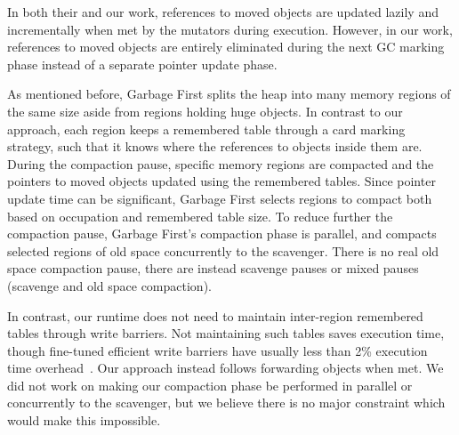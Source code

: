 \documentclass[sigplan,10pt,screen]{acmart}\settopmatter{printfolios=true,printccs=true,printacmref=true}
\newcommand{\egb}[1]{\color{blue}\fbox{\bfseries\sffamily\scriptsize Elisa:}{\sf\small$\blacktriangleright$\textit{#1}$\blacktriangleleft$}\color{black}}
\begin{document}
In both their and our work, references to moved objects are updated lazily and incrementally when met by the mutators during execution.
However, in our work, references to moved objects are entirely eliminated during the next GC marking phase instead of a separate pointer update phase.

As mentioned before, Garbage First \cite{G1} splits the heap into many memory regions of the same size aside from regions holding huge objects. In contrast to our approach, each region keeps a remembered table through a card marking strategy, such that it knows where the references to objects inside them are. During the compaction pause, specific memory regions are compacted and the pointers to moved objects updated using the remembered tables. Since pointer update time can be significant, Garbage First selects regions to compact both based on occupation and remembered table size. To reduce further the compaction pause, Garbage First's compaction phase is parallel, and compacts selected regions of old space concurrently to the scavenger. There is no real old space compaction pause, there are instead scavenge pauses or mixed pauses (scavenge and old space compaction). 

In contrast, our runtime does not need to maintain inter-region remembered tables through write barriers. Not maintaining such tables saves execution time, though fine-tuned efficient write barriers have usually less than 2\% execution time overhead~\cite{BarriersFriendFoe}. Our approach  instead follows forwarding objects when met.
We did not work on making our compaction phase be performed in parallel or concurrently to the scavenger, but we believe there is no major constraint which would make this impossible. 
\end{document}
